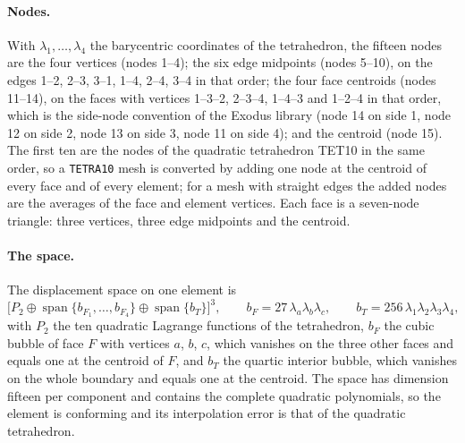 \documentclass{article}
\newcommand{\code}[1]{\texttt{#1}}
\theoremstyle{definition}
\theoremstyle{plain}
\begin{document}
\paragraph{Nodes.} With $\lambda_1, \dots, \lambda_4$ the barycentric
coordinates of the tetrahedron, the fifteen nodes are the four vertices
(nodes 1--4); the six edge midpoints (nodes 5--10), on the edges 1--2, 2--3,
3--1, 1--4, 2--4, 3--4 in that order; the four face centroids (nodes
11--14), on the faces with vertices 1--3--2, 2--3--4, 1--4--3 and 1--2--4 in
that order, which is the side-node convention of the Exodus library (node
14 on side 1, node 12 on side 2, node 13 on side 3, node 11 on side 4); and
the centroid (node 15). The first ten are the nodes of the quadratic
tetrahedron TET10 in the same order, so a \code{TETRA10} mesh is
converted by adding one node at the centroid of every face and of every
element; for a mesh with straight edges the added nodes are the averages of
the face and element vertices. Each face is a seven-node triangle: three
vertices, three edge midpoints and the centroid.

\paragraph{The space.} The displacement space on one element is
\begin{equation}
  \label{eq:space}
  \big[ P_2 \oplus \operatorname{span}\{b_{F_1}, \dots, b_{F_4}\}
        \oplus \operatorname{span}\{b_T\} \big]^3,
  \qquad
  b_F = 27\,\lambda_a\lambda_b\lambda_c, \qquad
  b_T = 256\,\lambda_1\lambda_2\lambda_3\lambda_4 ,
\end{equation}
with $P_2$ the ten quadratic Lagrange functions of the tetrahedron, $b_F$
the cubic bubble of face $F$ with vertices $a$, $b$, $c$, which vanishes on
the three other faces and equals one at the centroid of $F$, and $b_T$ the
quartic interior bubble, which vanishes on the whole boundary and equals
one at the centroid. The space has dimension fifteen per component and
contains the complete quadratic polynomials, so the element is conforming
and its interpolation error is that of the quadratic tetrahedron.
\end{document}
